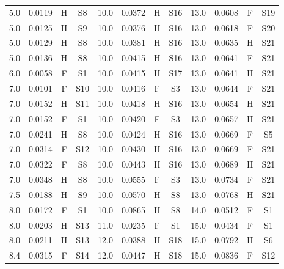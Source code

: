 \begin{table}[p]
\begin{tabular}{@{}cccc|cccc|cccc@{}}
5.0 & 0.0119 & H & S8 & 10.0 & 0.0372 & H & S16 & 13.0 & 0.0608 & F & S19\\
5.0 & 0.0125 & H & S9 & 10.0 & 0.0376 & H & S16 & 13.0 & 0.0618 & F & S20\\
5.0 & 0.0129 & H & S8 & 10.0 & 0.0381 & H & S16 & 13.0 & 0.0635 & H & S21\\
5.0 & 0.0136 & H & S8 & 10.0 & 0.0415 & H & S16 & 13.0 & 0.0641 & F & S21\\
6.0 & 0.0058 & F & S1 & 10.0 & 0.0415 & H & S17 & 13.0 & 0.0641 & H & S21\\
7.0 & 0.0101 & F & S10 & 10.0 & 0.0416 & F & S3 & 13.0 & 0.0644 & F & S21\\
7.0 & 0.0152 & H & S11 & 10.0 & 0.0418 & H & S16 & 13.0 & 0.0654 & H & S21\\
7.0 & 0.0152 & F & S1 & 10.0 & 0.0420 & F & S3 & 13.0 & 0.0657 & H & S21\\
7.0 & 0.0241 & H & S8 & 10.0 & 0.0424 & H & S16 & 13.0 & 0.0669 & F & S5\\
7.0 & 0.0314 & F & S12 & 10.0 & 0.0430 & H & S16 & 13.0 & 0.0669 & F & S21\\
7.0 & 0.0322 & F & S8 & 10.0 & 0.0443 & H & S16 & 13.0 & 0.0689 & H & S21\\
7.0 & 0.0348 & H & S8 & 10.0 & 0.0555 & F & S3 & 13.0 & 0.0734 & F & S21\\
7.5 & 0.0188 & H & S9 & 10.0 & 0.0570 & H & S8 & 13.0 & 0.0768 & H & S21\\
8.0 & 0.0172 & F & S1 & 10.0 & 0.0865 & H & S8 & 14.0 & 0.0512 & F & S1\\
8.0 & 0.0203 & H & S13 & 11.0 & 0.0235 & F & S1 & 15.0 & 0.0434 & F & S1\\
8.0 & 0.0211 & H & S13 & 12.0 & 0.0388 & H & S18 & 15.0 & 0.0792 & H & S6\\
8.4 & 0.0315 & F & S14 & 12.0 & 0.0447 & H & S18 & 15.0 & 0.0836 & F & S12\\
\bottomrule\end{tabular}


\end{table}
